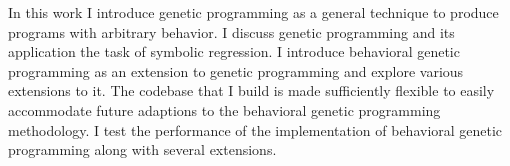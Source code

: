 % 
% 
%

In this work I introduce genetic programming \cite{koza} as a general technique to produce programs with arbitrary behavior.  I discuss genetic programming and its application the task of symbolic regression.  I introduce behavioral genetic programming \cite{krawiec} as an extension to genetic programming and explore various extensions to it.  The codebase that I build is made sufficiently flexible to easily accommodate future adaptions to the behavioral genetic programming methodology.  I test the performance of the implementation of behavioral genetic programming along with several extensions.